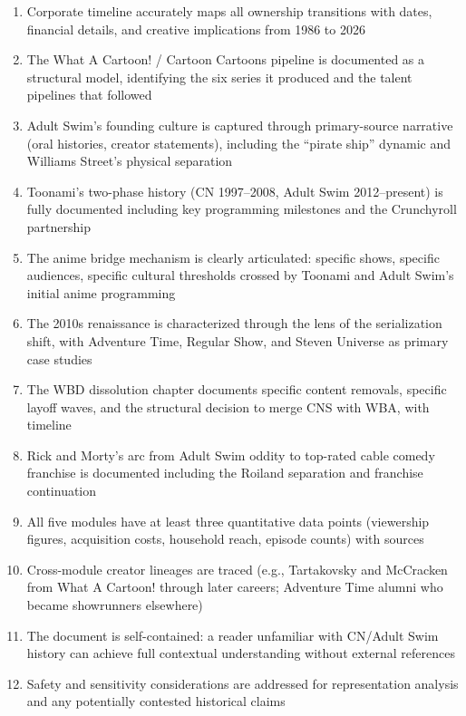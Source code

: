 \documentclass[11pt,letterpaper]{article}
\begin{document}
\begin{enumerate}
  \item Corporate timeline accurately maps all ownership transitions with dates, financial details, and creative implications from 1986 to 2026
  \item The What A Cartoon! / Cartoon Cartoons pipeline is documented as a structural model, identifying the six series it produced and the talent pipelines that followed
  \item Adult Swim's founding culture is captured through primary-source narrative (oral histories, creator statements), including the ``pirate ship'' dynamic and Williams Street's physical separation
  \item Toonami's two-phase history (CN 1997--2008, Adult Swim 2012--present) is fully documented including key programming milestones and the Crunchyroll partnership
  \item The anime bridge mechanism is clearly articulated: specific shows, specific audiences, specific cultural thresholds crossed by Toonami and Adult Swim's initial anime programming
  \item The 2010s renaissance is characterized through the lens of the serialization shift, with Adventure Time, Regular Show, and Steven Universe as primary case studies
  \item The WBD dissolution chapter documents specific content removals, specific layoff waves, and the structural decision to merge CNS with WBA, with timeline
  \item Rick and Morty's arc from Adult Swim oddity to top-rated cable comedy franchise is documented including the Roiland separation and franchise continuation
  \item All five modules have at least three quantitative data points (viewership figures, acquisition costs, household reach, episode counts) with sources
  \item Cross-module creator lineages are traced (e.g., Tartakovsky and McCracken from What A Cartoon! through later careers; Adventure Time alumni who became showrunners elsewhere)
  \item The document is self-contained: a reader unfamiliar with CN/Adult Swim history can achieve full contextual understanding without external references
  \item Safety and sensitivity considerations are addressed for representation analysis and any potentially contested historical claims
\end{enumerate}
\end{document}
